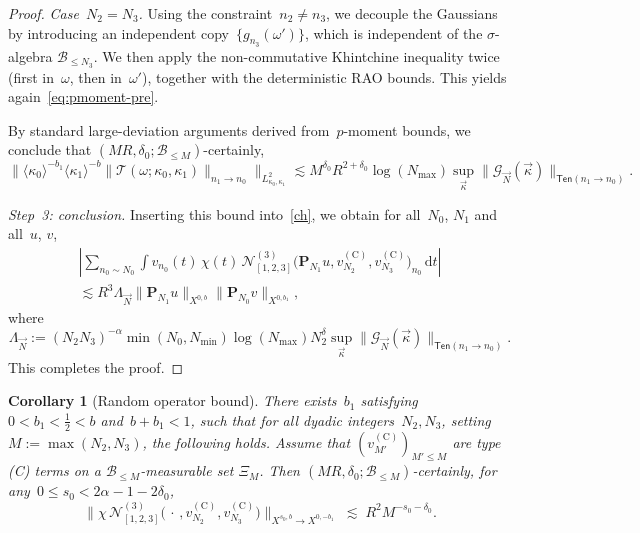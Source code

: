 \documentclass[11pt,reqno,english]{amsart}
\numberwithin{equation}{section}
\theoremstyle{plain}
\newtheorem{corollary}[theorem]{Corollary}
\theoremstyle{definition}
\theoremstyle{remark}
\begin{document}
\begin{proof}
	\noindent\emph{Case~$N_{2}=N_{3}$.}
	Using the constraint~$n_{2}\neq n_{3}$, we decouple the Gaussians by introducing
	an independent copy~$\{g_{n_{3}}(\omega')\}$, which is independent of the $\sigma$-algebra $\mathcal{B}_{\leq N_3}$. 
	We then apply the non-commutative Khintchine inequality twice
	(first in~$\omega$, then in~$\omega'$),
	together with the deterministic RAO bounds.
	This yields again~\eqref{eq:pmoment-pre}.

	By standard large-deviation arguments derived from~$p$-moment bounds,
	we conclude that $(MR,\delta_{0};\mathcal{B}_{\leq M})$-certainly,
	\[
	\Big\|
	\langle\kappa_{0}\rangle^{-b_{1}}
	\langle\kappa_{1}\rangle^{-b}
	\|\mathcal{T}(\omega;\kappa_{0},\kappa_{1})\|_{n_{1}\to n_{0}}
	\Big\|_{L_{\kappa_{0},\kappa_{1}}^{2}}
	\lesssim
	M^{\delta_0}R^{2+\delta_0}\log(N_{\max})
	\sup_{\vec{\kappa}}
	\|\mathcal{G}_{\vec{N}}(\vec{\kappa})\|_{\mathsf{Ten}(n_{1}\to n_{0})}.
	\]

	\emph{Step~3: conclusion.}
	Inserting this bound into~\eqref{ch}, we obtain for all~$N_{0}$, $N_{1}$ and all~$u$, $v$,
	\begin{multline}
		\label{din}
		\left|
		\sum_{n_{0}\sim N_{0}}
		\int
		v_{n_{0}}(t)\,
		\chi(t)\,
		\mathcal{N}_{[1,2,3]}^{(3)}
		\big(
		\mathbf{P}_{N_{1}}u,
		v_{N_{2}}^{(\mathrm{C})},
		v_{N_{3}}^{(\mathrm{C})}
		\big)_{n_{0}}
		\,\mathrm{d}t
		\right|
		\\
		\lesssim
		R^{3}\Lambda_{\vec{N}}
		\|\mathbf{P}_{N_{1}}u\|_{X^{0,b}}
		\|\mathbf{P}_{N_{0}}v\|_{X^{0,b_{1}}},
	\end{multline}
	where
	\[
	\Lambda_{\vec{N}}
	:=
	(N_{2}N_{3})^{-\alpha}
	\min(N_{0},N_{\mathrm{min}})
	\log(N_{\max})
	N_{2}^{\delta}
	\sup_{\vec{\kappa}}
	\|\mathcal{G}_{\vec{N}}(\vec{\kappa})\|_{\mathsf{Ten}(n_{1}\to n_{0})}.
	\]
	This completes the proof.
\end{proof}
	\begin{corollary}[Random operator bound]\label{cor:randomop}
		\label{prop:random-op}
		There exists~$b_{1}$ satisfying~$0<b_{1}<\tfrac12<b$ and~$b+b_{1}<1$,
		such that for all dyadic integers~$N_{2},N_{3}$, setting~$M:=\max(N_{2},N_{3})$, the following holds.
Assume that $(v_{M'}^{(\mathrm{C})})_{M'\leq M}$ are type (C) terms on a $\mathcal{B}_{\leq M}$-measurable set $\Xi_M$. Then
		$(MR,\delta_{0};\mathcal{B}_{\leq M})$-certainly, for any~$0\leq s_0< 2\alpha-1-2\delta_0$,
		\begin{equation}
			\label{eq:random-op}
			\Big\|
			\chi\,
			\mathcal{N}_{[1,2,3]}^{(3)}
			\big(\,\cdot\,,v_{N_{2}}^{(\mathrm{C})},v_{N_{3}}^{(\mathrm{C})}\big)
			\Big\|_{X^{s_0,b}\to X^{0,-b_{1}}}
			\;\lesssim\;
			R^{2}M^{-s_0-\delta_0}.
		\end{equation}
	\end{corollary}
	
\end{document}
